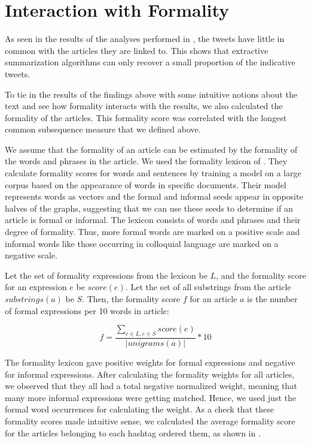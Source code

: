 \section{Interaction with Formality}

As seen in the results of the analyses performed in , the tweets have little in common with the articles they are linked to. This shows that extractive summarization algorithms can only recover a small proportion of the indicative tweets. 

To tie in the results of the findings above with some intuitive notions about the text and see how formality interacts with the results, we also calculated the formality of the articles. This formality score was correlated with the longest common subsequence measure that we defined above. 

We assume that the formality of an article can be estimated by the formality of the words and phrases in the article. We used the formality lexicon of . They calculate formality scores for words and sentences by training a model on a large corpus based on the appearance of words in specific documents. Their model represents words as vectors and the formal and informal seeds appear in opposite halves of the graphs, suggesting that we can use these seeds to determine if an article is formal or informal. The lexicon consists of words and phrases and their degree of formality. Thus, more formal words are marked on a positive scale and informal words like those occurring in colloquial language are marked on a negative scale. 

Let the set of formality expressions from the lexicon be $L$, and the formality score for an expression $e$ be $\textit{score}(e)$. Let the set of all substrings from the article $\textit{substrings}(a)$ be $S$. Then, the formality score $f$ for an article $a$ is the number of formal expressions per 10 words in article:  

\begin{equation}
f = \frac{\sum\limits_{e \in L, e \in S} \textit{score}(e)}{| unigrams(a) |} * 10
\end{equation}

The formality lexicon gave positive weights for formal expressions and negative for informal expressions. After calculating the formality weights for all articles, we observed that they all had a total negative normalized weight, meaning that many more informal expressions were getting matched. Hence, we used just the formal word occurrences for calculating the weight. As a check that these formality scores made intuitive sense, we calculated the average formality score for the articles belonging to each hashtag ordered them, as shown in .


